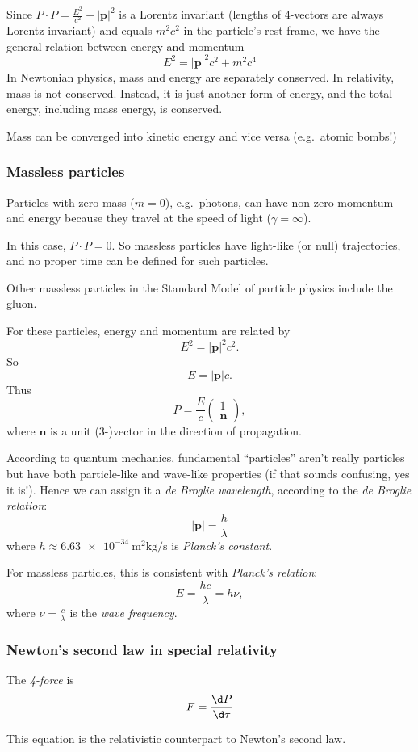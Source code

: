 \documentclass[a4paper]{article}
\begin{document}
Since $P\cdot P = \frac{E^2}{c^2} - |\mathbf{p}|^2$ is a Lorentz invariant (lengths of 4-vectors are always Lorentz invariant) and equals $m^2 c^2$ in the particle's rest frame, we have the general relation between energy and momentum
\[
  E^2 = |\mathbf{p}|^2 c^2 + m^2c^4
\]
In Newtonian physics, mass and energy are separately conserved. In relativity, mass is not conserved. Instead, it is just another form of energy, and the total energy, including mass energy, is conserved.

Mass can be converged into kinetic energy and vice versa (e.g.\ atomic bombs!)

\subsubsection*{Massless particles}
Particles with zero mass ($m = 0$), e.g.\ photons, can have non-zero momentum and energy because they travel at the speed of light ($\gamma = \infty$).

In this case, $P\cdot P = 0$. So massless particles have light-like (or null) trajectories, and no proper time can be defined for such particles.

Other massless particles in the Standard Model of particle physics include the gluon.

For these particles, energy and momentum are related by
\[
  E^2 = |\mathbf{p}|^2 c^2.
\]
So
\[
  E = |\mathbf{p}|c.
\]
Thus
\[
  P = \frac{E}{c}
  \begin{pmatrix}
    1\\
    \mathbf{n}
  \end{pmatrix},
\]
where $\mathbf{n}$ is a unit (3-)vector in the direction of propagation.

According to quantum mechanics, fundamental ``particles'' aren't really particles but have both particle-like and wave-like properties (if that sounds confusing, yes it is!). Hence we can assign it a \emph{de Broglie wavelength}, according to the \emph{de Broglie relation}:
\[
  |\mathbf{p}| = \frac{h}{\lambda}
\]
where $h \approx \SI{6.63e-34}{\meter\squared\kilogram\per\second}$ is \emph{Planck's constant}.

For massless particles, this is consistent with \emph{Planck's relation}:
\[
  E = \frac{hc}{\lambda} = h\nu,
\]
where $\nu = \frac{c}{\lambda}$ is the \emph{wave frequency}.
\subsubsection*{Newton's second law in special relativity}
\begin{defi}[4-force]
  The \emph{4-force} is
  \[
    F = \frac{\d P}{\d \tau}
  \]
\end{defi}
This equation is the relativistic counterpart to Newton's second law.
\end{document}
